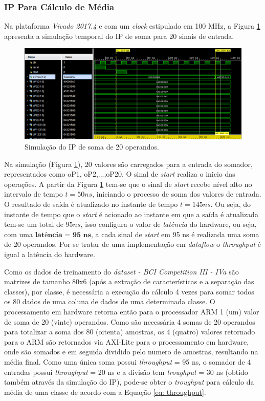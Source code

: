 \subsubsection{IP Para Cálculo de Média}

Na plataforma \textit{Vivado 2017.4} e com um \textit{clock} estipulado em 100 MHz, a Figura \ref{simulacao_sum} apresenta a simulação temporal do IP de soma para 20 sinais de entrada.

\begin{figure}[!h]
	\centering
	\includegraphics[keepaspectratio=true,scale=0.5]{figuras/Simulacao_somatorio.PNG}
	\caption{Simulação do IP de soma de 20 operandos.}
	\label{simulacao_sum}
\end{figure}

Na simulação (Figura \ref{simulacao_sum}), 20 valores são carregados para a entrada do somador, representados como oP1, oP2,...,oP20. O sinal de \textit{start} realiza o inicio das operações. A partir da Figura \ref{simulacao_sum} tem-se que o sinal de \textit{start} recebe nível alto no intervalo de tempo $t = 50 ns$, iniciando o processo de soma dos valores de entrada. O resultado de saída é atualizado no instante de tempo $t = 145 ns$. Ou seja, do instante de tempo que o \textit{start} é acionado ao instante em que a saída é atualizada tem-se um total de $95 ns$, isso configura o valor de \textit{latência} do hardware, ou seja, com uma $\textbf{latência = 95 ns}$, a cada sinal de \textit{start} em 95 ns é realizada uma soma de 20 operandos. Por se tratar de uma implementação em \textit{dataflow} o \textit{throughput} é igual a latência do hardware. 

Como os dados de treinamento do \textit{dataset - BCI Competition III - IVa} são matrizes de tamanho 80x6 (após a extração de características e a separação das classes), por classe, é necessária a execução do cálculo 4 vezes para somar todos os 80 dados de uma coluna de dados de uma determinada classe. O processamento em hardware retorna então para o processador ARM 1 (um) valor de soma de 20 (vinte) operandos. Como são necessária 4 somas de 20 operandos para totalizar a soma dos 80 (oitenta) amostras, os 4 (quatro) valores retornado para o ARM são retornados via AXI-Lite para o processamento em hardware, onde são somados e em seguida dividido pelo numero de amostras, resultando na média final. Como uma única soma possui \textit{throughput} = 95 ns, o somador de 4 entradas possui \textit{throughput} = 20 ns e a divisão tem \textit{troughput} = 30 ns (obtido também através da simulação do IP), pode-se obter o \textit{troughput} para cálculo da média de uma classe de acordo com a Equação \ref{eq: throughput}.

